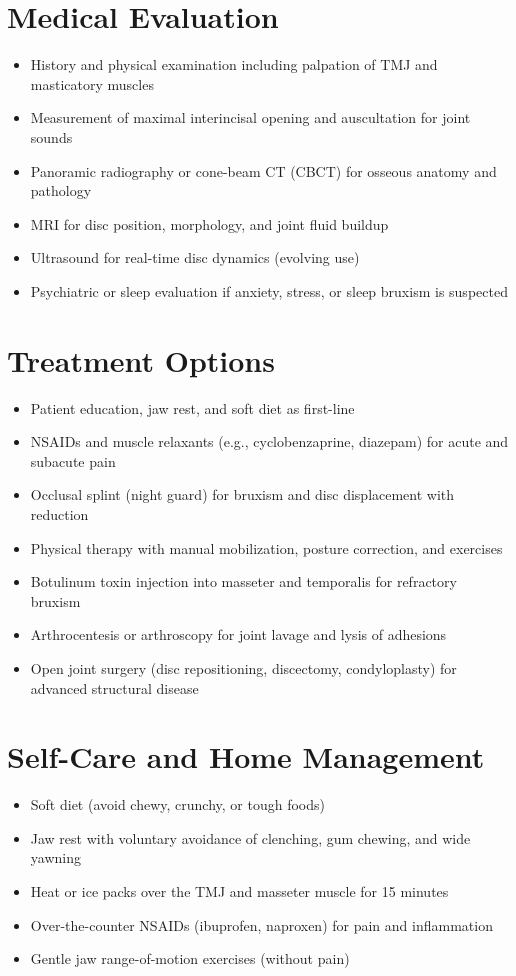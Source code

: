 \section*{Medical Evaluation}
\begin{itemize}
  \item History and physical examination including palpation of TMJ and masticatory muscles
  \item Measurement of maximal interincisal opening and auscultation for joint sounds
  \item Panoramic radiography or cone-beam CT (CBCT) for osseous anatomy and pathology
  \item MRI for disc position, morphology, and joint fluid buildup
  \item Ultrasound for real-time disc dynamics (evolving use)
  \item Psychiatric or sleep evaluation if anxiety, stress, or sleep bruxism is suspected
\end{itemize}

\section*{Treatment Options}
\begin{itemize}
  \item Patient education, jaw rest, and soft diet as first-line
  \item NSAIDs and muscle relaxants (e.g., cyclobenzaprine, diazepam) for acute and subacute pain
  \item Occlusal splint (night guard) for bruxism and disc displacement with reduction
  \item Physical therapy with manual mobilization, posture correction, and exercises
  \item Botulinum toxin injection into masseter and temporalis for refractory bruxism
  \item Arthrocentesis or arthroscopy for joint lavage and lysis of adhesions
  \item Open joint surgery (disc repositioning, discectomy, condyloplasty) for advanced structural disease
\end{itemize}

\section*{Self-Care and Home Management}
\begin{itemize}
  \item Soft diet (avoid chewy, crunchy, or tough foods)
  \item Jaw rest with voluntary avoidance of clenching, gum chewing, and wide yawning
  \item Heat or ice packs over the TMJ and masseter muscle for 15 minutes
  \item Over-the-counter NSAIDs (ibuprofen, naproxen) for pain and inflammation
  \item Gentle jaw range-of-motion exercises (without pain)
\end{itemize}

